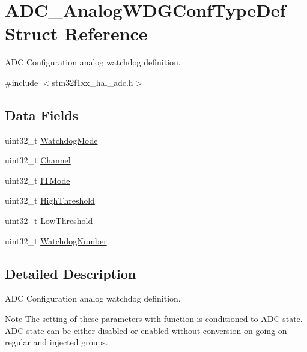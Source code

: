 \hypertarget{struct_a_d_c___analog_w_d_g_conf_type_def}{}\section{A\+D\+C\+\_\+\+Analog\+W\+D\+G\+Conf\+Type\+Def Struct Reference}
\label{struct_a_d_c___analog_w_d_g_conf_type_def}


A\+DC Configuration analog watchdog definition.  




{\ttfamily \#include $<$stm32f1xx\+\_\+hal\+\_\+adc.\+h$>$}

\subsection*{Data Fields}
\begin{DoxyCompactItemize}
\item 
uint32\+\_\+t \hyperlink{struct_a_d_c___analog_w_d_g_conf_type_def_a13924e920be2454c955a2139e2c3eb1a}{Watchdog\+Mode}
\item 
uint32\+\_\+t \hyperlink{struct_a_d_c___analog_w_d_g_conf_type_def_ae82bf9242a014164f9f6907f29782c44}{Channel}
\item 
uint32\+\_\+t \hyperlink{struct_a_d_c___analog_w_d_g_conf_type_def_adb9d0be5088ff9f6e0b5e4bbb9088904}{I\+T\+Mode}
\item 
uint32\+\_\+t \hyperlink{struct_a_d_c___analog_w_d_g_conf_type_def_a5c3a76d9a8ac84c537e7df10b0315e5a}{High\+Threshold}
\item 
uint32\+\_\+t \hyperlink{struct_a_d_c___analog_w_d_g_conf_type_def_a018c772cad96f1f0493ec0019ecc08f9}{Low\+Threshold}
\item 
uint32\+\_\+t \hyperlink{struct_a_d_c___analog_w_d_g_conf_type_def_a316457f389072f7a80b62e2b3c8fdef4}{Watchdog\+Number}
\end{DoxyCompactItemize}


\subsection{Detailed Description}
A\+DC Configuration analog watchdog definition. 

\begin{DoxyNote}{Note}
The setting of these parameters with function is conditioned to A\+DC state. A\+DC state can be either disabled or enabled without conversion on going on regular and injected groups. 
\end{DoxyNote}


